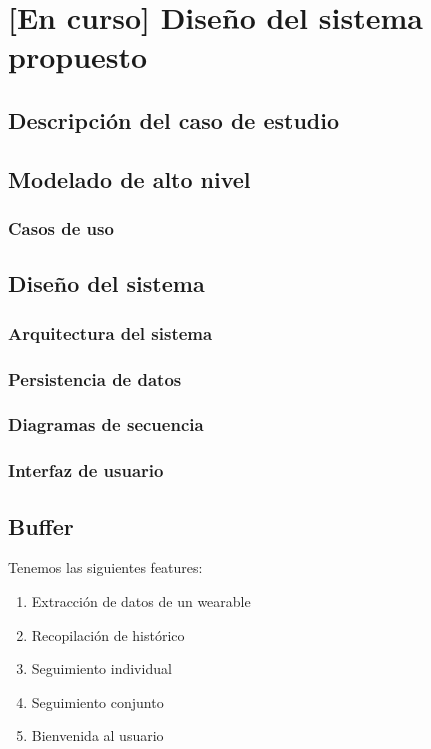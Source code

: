\chapter{[En curso] Diseño del sistema propuesto}
\label{chapter:disenio}


\section{Descripción del caso de estudio} \label{section:CasoEstudio}


\section{Modelado de alto nivel}
    \subsection{Casos de uso}

\section{Diseño del sistema}

    \subsection{Arquitectura del sistema}
    \subsection{Persistencia de datos}
    \subsection{Diagramas de secuencia}
    \subsection{Interfaz de usuario}

\section{Buffer}

Tenemos las siguientes features:
\begin{enumerate}
    \item Extracción de datos de un \gls{wearable}
    \item Recopilación de histórico
    \item Seguimiento individual
    \item Seguimiento conjunto
    \item Bienvenida al usuario
\end{enumerate}

